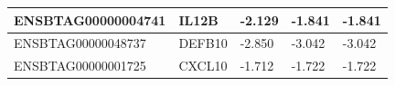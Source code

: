 \documentclass[../main.tex]{subfiles}
\begin{document}
\begin{flushleft}
\begin{center}
\begin{tabular}{|l|l|l|l|l|}
            \hline
            ENSBTAG00000004741                             & IL12B                                     & -2.129                                                                                                                      & -1.841                                                                                                                & -1.841                                                                                                                 \\ 
            \hline
            ENSBTAG00000048737                             & DEFB10                                    & -2.850                                                                                                                      & -3.042                                                                                                                & -3.042                                                                                                                 \\ 
            \hline
            ENSBTAG00000001725                             & CXCL10                                    & -1.712                                                                                                                      & -1.722                                                                                                                & -1.722                                                                                                                 \\
            \hline
        \end{tabular}
\end{center}


\end{flushleft}
\end{document}
